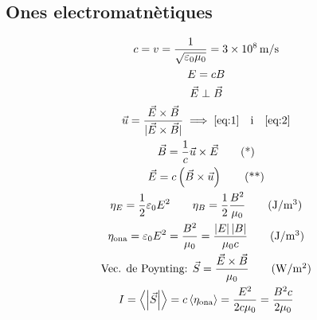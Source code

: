 \documentclass[10pt,twocolumn]{article}
\begin{document}
\subsection{Ones electromatnètiques}
\begin{gather*}
    c = v = \frac{1}{\sqrt{\varepsilon_0 \mu_0}} = \SI{3e8}{\meter/\second} \\
    E = cB \\
    \vec{E} \perp \vec{B} \\
    \vec{u} = \frac{\vec{E}\times\vec{B}}{|\vec{E}\times\vec{B}|} \implies \ref{eq:1} \quad \text{i} \quad \ref{eq:2}\\
    \vec{B} = \frac{1}{c}\vec{u}\times\vec{E}\tag{*}\label{eq:1} \\
    \vec{E} = c\left(\vec{B}\times\vec{u}\right) \tag{**}\label{eq:2} \\
    \eta_E = \frac{1}{2}\varepsilon_0 E^2 \qquad \eta_B = \frac{1}{2} \frac{B^2}{\mu_0} \tag{\si{J/m^3}}\\
    \eta_\text{ona} = \varepsilon_0E^2 = \frac{B^2}{\mu_0} = \frac{\left|E\right|\left|B\right|}{\mu_0 c} \tag{\si{J/m^3}} \\
    \text{Vec. de Poynting: } \vec{S} = \frac{\vec{E}\times\vec{B}}{\mu_0} \tag{\si{W/m^2}} \\
    I = \left<\left|\vec{S}\right|\right> = c\left<\eta_\text{ona}\right> = \frac{E^2}{2c\mu_0} = \frac{B^2 c}{2\mu_0}
\end{gather*}
\end{document}
